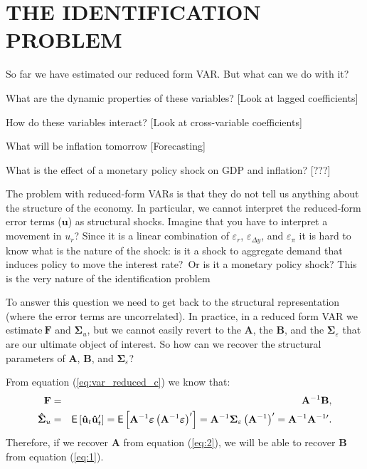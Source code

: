 \documentclass[11pt,a4paper]{report}
\numberwithin{equation}{chapter}
\numberwithin{section}{chapter}
\begin{document}
\chapter{THE IDENTIFICATION PROBLEM}

So far we have estimated our reduced form VAR. But what can we do with it?

What are the dynamic properties of these variables? [{Look at lagged
coefficients}]

How do these variables interact? [{Look at cross-variable coefficients}]

What will be inflation tomorrow [{Forecasting}]

What is the effect of a monetary policy shock on GDP and inflation? [{???}]

\noindent The problem with reduced-form VARs is that they do not tell us
anything about the structure of the economy. In particular, we cannot
interpret the reduced-form error terms ($\mathbf{u}$) as {structural shocks.
Imagine that you have to }interpret a movement in $u_{r}$? Since it is a
linear combination of $\varepsilon _{r}$, $\varepsilon _{\Delta y}$, and $%
\varepsilon _{\pi }$ it is hard to know what is the nature of the shock: is
it a shock to aggregate demand that induces policy to move the interest
rate?\ Or is it a monetary policy shock? This is the very nature of the {%
identification problem}

To answer this question we need to get back to the structural representation
(where the error terms are uncorrelated). In practice, in a reduced form VAR
we estimate$\ \mathbf{F}$ and $\mathbf{\Sigma }_{u}$, but we cannot easily
revert to the $\mathbf{A}$, the $\mathbf{B}$, and the $\mathbf{\Sigma }%
_{\varepsilon }$ that are our ultimate object of interest. So how can we
recover the structural parameters of $\mathbf{A}$, $\mathbf{B}$, and $%
\mathbf{\Sigma }_{\varepsilon }$?

From equation (\ref{eq:var_reduced_c}) we know that:%
\begin{eqnarray}
\mathbf{F} &=&\mathbf{A}^{-1}\mathbf{B},  \label{eq:1} \\
\mathbf{\hat{\Sigma}}_{u} &=&\mathsf{E}\left[ \mathbf{\hat{u}}_{t}\mathbf{%
\hat{u}}_{t}^{\prime }\right] =\mathsf{E}\left[ \mathbf{A}^{-1}\mathbf{%
\varepsilon }\left( \mathbf{A}^{-1}\mathbf{\varepsilon }\right) ^{\prime }%
\right] =\mathbf{A}^{-1}\mathbf{\Sigma }_{\varepsilon }\left( \mathbf{A}%
^{-1}\right) ^{\prime }=\mathbf{A}^{-1}\mathbf{A}^{-1\prime }.  \label{eq:2}
\end{eqnarray}%
Therefore, if we recover $\mathbf{A}$ from equation (\ref{eq:2}), we will be
able to recover $\mathbf{B}$ from equation (\ref{eq:1}).
\end{document}
